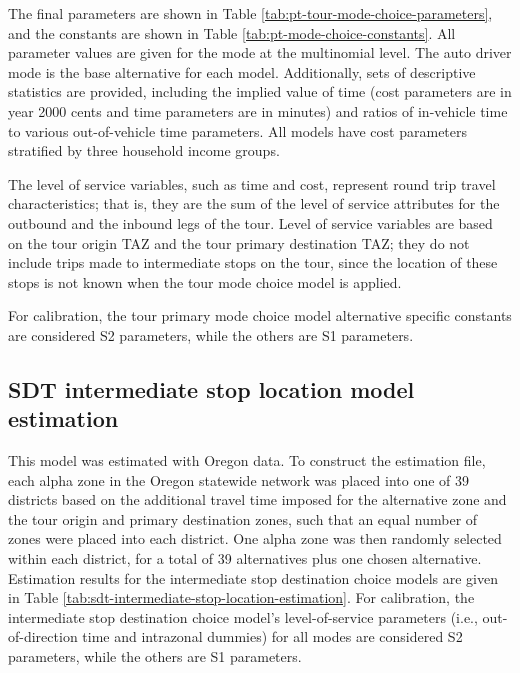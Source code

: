 The final parameters are shown in Table \ref{tab:pt-tour-mode-choice-parameters}, and the constants are shown in Table \ref{tab:pt-mode-choice-constants}. All parameter values are given for the mode at the multinomial level. The auto driver mode is the base alternative for each model. Additionally, sets of descriptive statistics are provided, including the implied value of time (cost parameters are in year 2000 cents and time parameters are in minutes) and ratios of in-vehicle time to various out-of-vehicle time parameters. All models have cost parameters stratified by three household income groups.


The level of service variables, such as time and cost, represent round trip travel characteristics; that is, they are the sum of the level of service attributes for the outbound and the inbound legs of the tour. Level of service variables are based on the tour origin TAZ and the tour primary destination TAZ; they do not include trips made to intermediate stops on the tour, since the location of these stops is not known when the tour mode choice model is applied.

For calibration, the tour primary mode choice model alternative specific constants are considered S2 parameters, while the others are S1 parameters. 


 

\subsection{SDT intermediate stop location model estimation}\label{sec:sdt-intermediate-stop-location}
This model was estimated with Oregon data. To construct the estimation file, each alpha zone in the Oregon statewide network was placed into one of 39 districts based on the additional travel time imposed for the alternative zone and the tour origin and primary destination zones, such that an equal number of zones were placed into each district. One alpha zone was then randomly selected within each district, for a total of 39 alternatives plus one chosen alternative. Estimation results for the intermediate stop destination choice models are given in Table \ref{tab:sdt-intermediate-stop-location-estimation}. For calibration, the intermediate stop destination choice model's level-of-service parameters (i.e., out-of-direction time and intrazonal dummies) for all modes are considered S2 parameters, while the others are S1 parameters.


